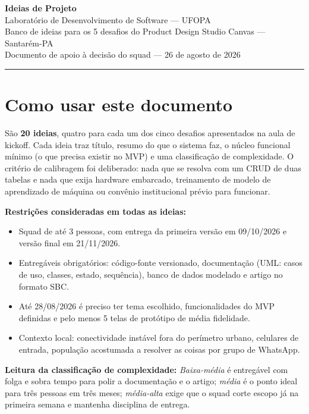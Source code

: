 \documentclass[11pt,a4paper]{article}
\begin{document}
\begin{center}
{\Huge\bfseries\color{azul} Ideias de Projeto}\\[4pt]
{\large Laboratório de Desenvolvimento de Software --- UFOPA}\\[2pt]
{\color{cinza} Banco de ideias para os 5 desafios do Product Design Studio Canvas --- Santarém-PA}\\[6pt]
{\small\color{cinza} Documento de apoio à decisão do squad --- 26 de agosto de 2026}
\end{center}

\vspace{6pt}
\hrule
\vspace{10pt}

\section*{Como usar este documento}

São \textbf{20 ideias}, quatro para cada um dos cinco desafios apresentados na aula de kickoff.
Cada ideia traz título, resumo do que o sistema faz, o núcleo funcional mínimo (o que precisa
existir no MVP) e uma classificação de complexidade. O critério de calibragem foi deliberado:
nada que se resolva com um CRUD de duas tabelas e nada que exija hardware embarcado,
treinamento de modelo de aprendizado de máquina ou convênio institucional prévio para funcionar.

\textbf{Restrições consideradas em todas as ideias:}

\begin{itemize}
  \item Squad de até 3 pessoas, com entrega da primeira versão em 09/10/2026 e versão final em 21/11/2026.
  \item Entregáveis obrigatórios: código-fonte versionado, documentação (UML: casos de uso, classes, estado, sequência), banco de dados modelado e artigo no formato SBC.
  \item Até 28/08/2026 é preciso ter tema escolhido, funcionalidades do MVP definidas e pelo menos 5 telas de protótipo de média fidelidade.
  \item Contexto local: conectividade instável fora do perímetro urbano, celulares de entrada, população acostumada a resolver as coisas por grupo de WhatsApp.
\end{itemize}

\textbf{Leitura da classificação de complexidade:}
\textit{Baixa-média} é entregável com folga e sobra tempo para polir a documentação e o artigo;
\textit{média} é o ponto ideal para três pessoas em três meses; \textit{média-alta} exige que o
squad corte escopo já na primeira semana e mantenha disciplina de entrega.
\end{document}
